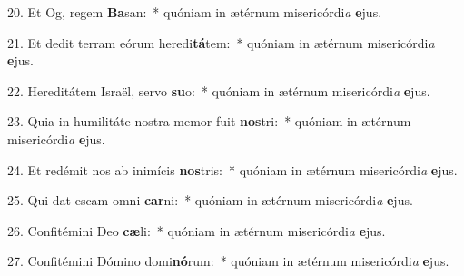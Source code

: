 20. Et Og, regem \textbf{Ba}san:~*  quóniam in ætérnum misericórdi\textit{a} \textbf{e}jus.\

21. Et dedit terram eórum heredi\textbf{tá}tem:~*  quóniam in ætérnum misericórdi\textit{a} \textbf{e}jus.\

22. Hereditátem Israël, servo \textbf{su}o:~*  quóniam in ætérnum misericórdi\textit{a} \textbf{e}jus.\

23. Quia in humilitáte nostra memor fuit \textbf{nos}tri:~*  quóniam in ætérnum misericórdi\textit{a} \textbf{e}jus.\

24. Et redémit nos ab inimícis \textbf{nos}tris:~*  quóniam in ætérnum misericórdi\textit{a} \textbf{e}jus.\

25. Qui dat escam omni \textbf{car}ni:~*  quóniam in ætérnum misericórdi\textit{a} \textbf{e}jus.\

26. Confitémini Deo \textbf{cæ}li:~*  quóniam in ætérnum misericórdi\textit{a} \textbf{e}jus.\

27. Confitémini Dómino domi\textbf{nó}rum:~*  quóniam in ætérnum misericórdi\textit{a} \textbf{e}jus.\

